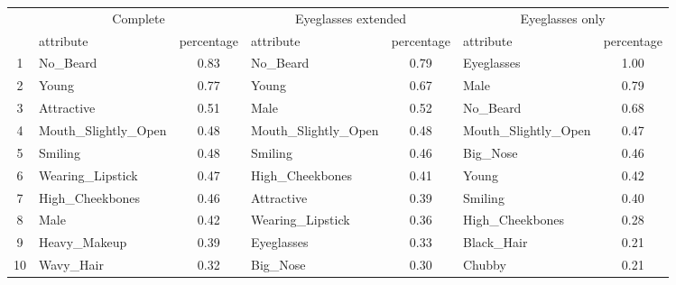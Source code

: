 \begin{tabular}{|c|lc|lc|lc|}
\toprule
 & \multicolumn{2}{c|}{Complete} & \multicolumn{2}{c|}{Eyeglasses extended} & \multicolumn{2}{c|}{Eyeglasses only} \\
 & attribute & percentage & attribute & percentage & attribute & percentage \\
\midrule
1 & No\_Beard & 0.83 & No\_Beard & 0.79 & Eyeglasses & 1.00 \\
2 & Young & 0.77 & Young & 0.67 & Male & 0.79 \\
3 & Attractive & 0.51 & Male & 0.52 & No\_Beard & 0.68 \\
4 & Mouth\_Slightly\_Open & 0.48 & Mouth\_Slightly\_Open & 0.48 & Mouth\_Slightly\_Open & 0.47 \\
5 & Smiling & 0.48 & Smiling & 0.46 & Big\_Nose & 0.46 \\
6 & Wearing\_Lipstick & 0.47 & High\_Cheekbones & 0.41 & Young & 0.42 \\
7 & High\_Cheekbones & 0.46 & Attractive & 0.39 & Smiling & 0.40 \\
8 & Male & 0.42 & Wearing\_Lipstick & 0.36 & High\_Cheekbones & 0.28 \\
9 & Heavy\_Makeup & 0.39 & Eyeglasses & 0.33 & Black\_Hair & 0.21 \\
10 & Wavy\_Hair & 0.32 & Big\_Nose & 0.30 & Chubby & 0.21 \\
\bottomrule
\end{tabular}
